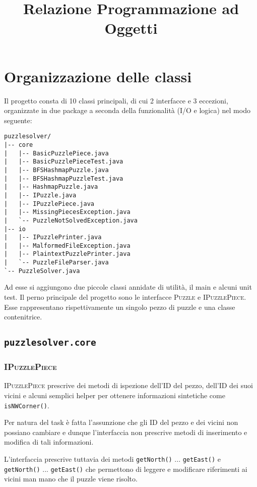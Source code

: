 \documentclass[a4paper]{article}
\title{Relazione Programmazione ad Oggetti}
\newcommand{\Classname}[1]{\textsc{#1}}
\newcommand{\Ifacename}[1]{\textsc{#1}}
\newcommand{\Methodname}[1]{\texttt{#1}}
\newcommand{\Pkgname}[1]{\texttt{#1}}
\begin{document}
\maketitle
\tableofcontents
\section{Organizzazione delle classi}

Il progetto consta di 10 classi principali, di cui 2 interfacce e 3 eccezioni, organizzate in due package a seconda della funzionalit\`a (I/O e logica) nel modo seguente:

\begin{verbatim}
puzzlesolver/
|-- core
|   |-- BasicPuzzlePiece.java
|   |-- BasicPuzzlePieceTest.java
|   |-- BFSHashmapPuzzle.java
|   |-- BFSHashmapPuzzleTest.java
|   |-- HashmapPuzzle.java
|   |-- IPuzzle.java
|   |-- IPuzzlePiece.java
|   |-- MissingPiecesException.java
|   `-- PuzzleNotSolvedException.java
|-- io
|   |-- IPuzzlePrinter.java
|   |-- MalformedFileException.java
|   |-- PlaintextPuzzlePrinter.java
|   `-- PuzzleFileParser.java
`-- PuzzleSolver.java
\end{verbatim}

Ad esse si aggiungono due piccole classi annidate di utilit\`a, il main e alcuni unit test.
Il perno principale del progetto sono le interfacce \Ifacename{Puzzle} e \Ifacename{IPuzzlePiece}.
Esse rappresentano rispettivamente un singolo pezzo di puzzle e una classe contenitrice.
\subsection{\Pkgname{puzzlesolver.core}}
\subsubsection{\Classname{IPuzzlePiece}}
\Ifacename{IPuzzlePiece} prescrive dei metodi di ispezione dell'ID del pezzo, dell'ID dei suoi vicini e alcuni semplici helper per ottenere informazioni sintetiche come \Methodname{isNWCorner()}.

Per natura del task \`e fatta l'assunzione che gli ID del pezzo e dei vicini non possiano cambiare e dunque l'interfaccia non prescrive metodi di inserimento e modifica di tali informazioni.

L'interfaccia prescrive tuttavia dei metodi \Methodname{getNorth()} ... \Methodname{getEast()}  e  \Methodname{getNorth()} ... \Methodname{getEast()} che permettono di leggere e modificare riferimenti ai vicini man mano che il puzzle viene risolto.
\end{document}
